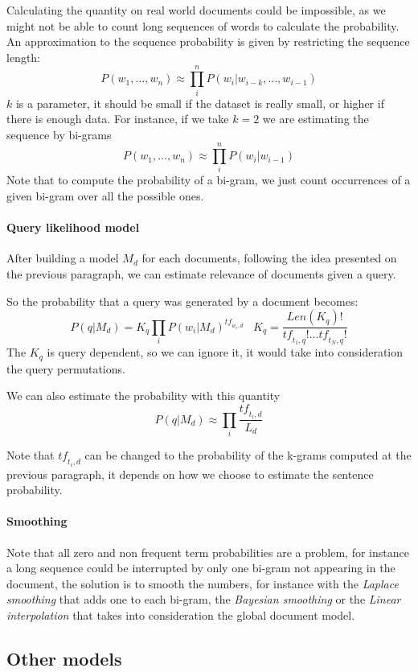 Calculating the quantity on real world documents could be impossible, 
as we might not be able to count long sequences of words to calculate the probability.
An approximation to the sequence probability is given by restricting the sequence length:
$$P(w_1, \dots, w_n) \approx \prod_i^nP(w_i | w_{i-k}, \dots, w_{i-1})$$
$k$ is a parameter, it should be 
small if the dataset is really small, or higher if there is enough data. For instance, 
if we take $k=2$ we are estimating the sequence by bi-grams
$$P(w_1, \dots, w_n) \approx \prod_i^nP(w_i | w_{i-1})$$
Note that to compute the probability of a bi-gram, we just count occurrences of a given bi-gram 
over all the possible ones.

\paragraph{Query likelihood model}
After building a model $M_d$ for each documents, following the idea presented on the previous paragraph, 
we can estimate relevance of documents given a query. 

So the probability that a query was generated by a document becomes:
$$P(q|M_d) = K_q\prod_iP(w_i|M_d)^{\mathit{tf}_{w_i, d}}\;\;\; 
K_q = \frac{\mathit{Len}(K_q)!}{\mathit{tf}_{t_1, q}! \dots \mathit{tf}_{t_N, q}!}$$
The $K_q$ is query dependent, so we can ignore it, it would take into consideration 
the query permutations.

We can also estimate the probability with this quantity 
$$P(q|M_d) \approx \prod_i\frac{\mathit{tf}_{t_i, d}}{L_d}$$

Note that $\mathit{tf}_{t_i, d}$ can be changed to the probability of the 
k-grams computed at the previous paragraph, it depends on how we choose to 
estimate the sentence probability.

\paragraph{Smoothing}
Note that all zero and non frequent term probabilities are a problem, 
for instance a long sequence could be interrupted by only one bi-gram not appearing in 
the document, the solution
is to smooth the numbers, for instance with the \emph{Laplace smoothing} that adds 
one to each bi-gram, the \emph{Bayesian smoothing} or the \emph{Linear interpolation} that 
takes into consideration the global document model.

\subsection{Other models}
